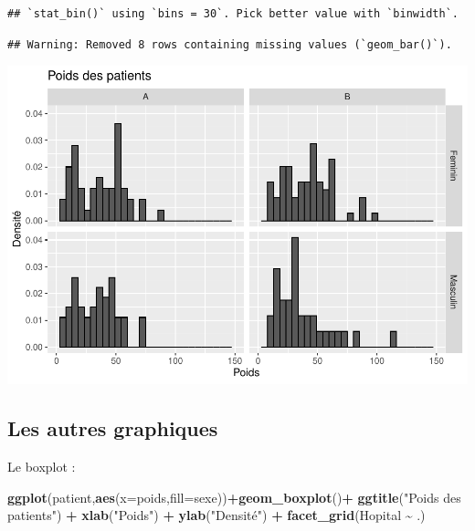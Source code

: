 \documentclass[
]{book}
\newenvironment{Shaded}{\begin{snugshade}}{\end{snugshade}}
\newcommand{\AttributeTok}[1]{\textcolor[rgb]{0.13,0.29,0.53}{#1}}
\newcommand{\FunctionTok}[1]{\textcolor[rgb]{0.13,0.29,0.53}{\textbf{#1}}}
\newcommand{\NormalTok}[1]{#1}
\newcommand{\SpecialCharTok}[1]{\textcolor[rgb]{0.81,0.36,0.00}{\textbf{#1}}}
\newcommand{\StringTok}[1]{\textcolor[rgb]{0.31,0.60,0.02}{#1}}
\begin{document}
\begin{verbatim}
## `stat_bin()` using `bins = 30`. Pick better value with `binwidth`.
\end{verbatim}

\begin{verbatim}
## Warning: Removed 8 rows containing missing values (`geom_bar()`).
\end{verbatim}

\includegraphics{_main_files/figure-latex/ggplot11-1.pdf}

\hypertarget{les-autres-graphiques}{%
\subsection{Les autres graphiques}\label{les-autres-graphiques}}

Le boxplot :

\begin{Shaded}
\begin{Highlighting}[]
\FunctionTok{ggplot}\NormalTok{(patient,}\FunctionTok{aes}\NormalTok{(}\AttributeTok{x=}\NormalTok{poids,}\AttributeTok{fill=}\NormalTok{sexe))}\SpecialCharTok{+}\FunctionTok{geom\_boxplot}\NormalTok{()}\SpecialCharTok{+}
  \FunctionTok{ggtitle}\NormalTok{(}\StringTok{"Poids des patients"}\NormalTok{) }\SpecialCharTok{+} 
  \FunctionTok{xlab}\NormalTok{(}\StringTok{"Poids"}\NormalTok{) }\SpecialCharTok{+} 
  \FunctionTok{ylab}\NormalTok{(}\StringTok{"Densité"}\NormalTok{) }\SpecialCharTok{+}
  \FunctionTok{facet\_grid}\NormalTok{(Hopital }\SpecialCharTok{\textasciitilde{}}\NormalTok{ .)}
\end{Highlighting}
\end{Shaded}
\end{document}
